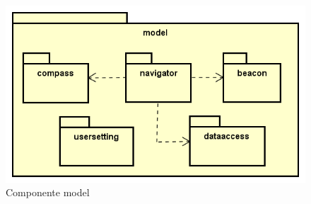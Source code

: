 \documentclass[../DefinizioneDiProdotto.tex]{subfiles}
\begin{document}
\begin{figure}[H]
	\centering
	\includegraphics[width=\maxwidth]{img/package/model.png}
	\caption{Componente model}\label{fig:model} 
\end{figure}
\end{document}
